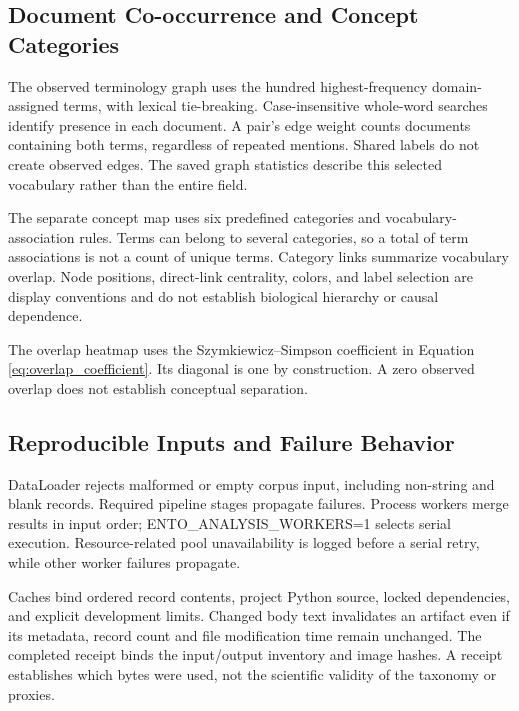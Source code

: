 \documentclass[
]{article}
\numberwithin{equation}{section}
\begin{document}
\subsection{Document Co-occurrence and Concept
Categories}\label{document-co-occurrence-and-concept-categories}

The observed terminology graph uses the hundred highest-frequency
domain-assigned terms, with lexical tie-breaking. Case-insensitive
whole-word searches identify presence in each document. A pair's edge
weight counts documents containing both terms, regardless of repeated
mentions. Shared labels do not create observed edges. The saved graph
statistics describe this selected vocabulary rather than the entire
field.

The separate concept map uses six predefined categories and
vocabulary-association rules. Terms can belong to several categories, so
a total of term associations is not a count of unique terms. Category
links summarize vocabulary overlap. Node positions, direct-link
centrality, colors, and label selection are display conventions and do
not establish biological hierarchy or causal dependence.

The overlap heatmap uses the Szymkiewicz--Simpson coefficient in
Equation \ref{eq:overlap_coefficient}. Its diagonal is one by
construction. A zero observed overlap does not establish conceptual
separation.

\subsection{Reproducible Inputs and Failure
Behavior}\label{reproducible-inputs-and-failure-behavior}

DataLoader rejects malformed or empty corpus input, including non-string
and blank records. Required pipeline stages propagate failures. Process
workers merge results in input order; ENTO\_ANALYSIS\_WORKERS=1 selects
serial execution. Resource-related pool unavailability is logged before
a serial retry, while other worker failures propagate.

Caches bind ordered record contents, project Python source, locked
dependencies, and explicit development limits. Changed body text
invalidates an artifact even if its metadata, record count and file
modification time remain unchanged. The completed receipt binds the
input/output inventory and image hashes. A receipt establishes which
bytes were used, not the scientific validity of the taxonomy or proxies.

\clearpage
\end{document}
